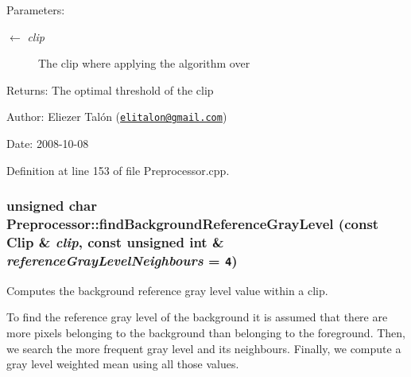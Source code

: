 \begin{Desc}
\item[Parameters:]
\begin{description}
\item[\mbox{$\leftarrow$} {\em clip}]The clip where applying the algorithm over\end{description}
\end{Desc}
\begin{Desc}
\item[Returns:]The optimal threshold of the clip\end{Desc}
\begin{Desc}
\item[Author:]Eliezer Talón (\href{mailto:elitalon@gmail.com}{\tt elitalon@gmail.com}) \end{Desc}
\begin{Desc}
\item[Date:]2008-10-08 \end{Desc}


Definition at line 153 of file Preprocessor.cpp.\hypertarget{class_preprocessor_19aa90451cf6f99854833c05d3e71270}{
\subsubsection[findBackgroundReferenceGrayLevel]{\setlength{\rightskip}{0pt plus 5cm}unsigned char Preprocessor::findBackgroundReferenceGrayLevel (const {\bf Clip} \& {\em clip}, \/  const unsigned int \& {\em referenceGrayLevelNeighbours} = {\tt 4})}}
\label{class_preprocessor_19aa90451cf6f99854833c05d3e71270}


Computes the background reference gray level value within a clip. 

To find the reference gray level of the background it is assumed that there are more pixels belonging to the background than belonging to the foreground. Then, we search the more frequent gray level and its neighbours. Finally, we compute a gray level weighted mean using all those values.

